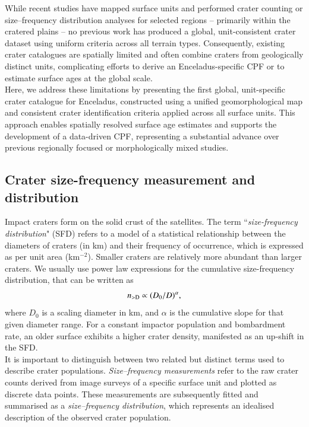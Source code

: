 \documentclass[preprint,11pt,3p,times,authoryear]{elsarticle}
\begin{document}
While recent studies have mapped surface units and performed crater counting or size–frequency distribution analyses for selected regions -- primarily within the cratered plains -- no previous work has produced a global, unit-consistent crater dataset using uniform criteria across all terrain types. Consequently, existing crater catalogues are spatially limited and often combine craters from geologically distinct units, complicating efforts to derive an Enceladus-specific CPF or to estimate surface ages at the global scale.\\

Here, we address these limitations by presenting the first global, unit-specific crater catalogue for Enceladus, constructed using a unified geomorphological map and consistent crater identification criteria applied across all surface units. This approach enables spatially resolved surface age estimates and supports the development of a data-driven CPF, representing a substantial advance over previous regionally focused or morphologically mixed studies.

\subsection{Crater size-frequency measurement and distribution}
\label{sub:sfd}
Impact craters form on the solid crust of the satellites. The term ``{\it size-frequency distribution}" (SFD) refers to a model of a statistical relationship between the diameters of craters (in km) and their frequency of occurrence, which is expressed as per unit area (km$^{-2}$). Smaller craters are relatively more abundant than larger craters. We usually use power law expressions for the cumulative size-frequency distribution, that can be written as
\begin{equation}
  n_{\rm >D} \propto (D_0/D)^\alpha, %
\end{equation}
where $D_0$ is a scaling diameter in km, and $\alpha$ is the cumulative slope for that given diameter range. For a constant impactor population and bombardment rate, an older surface exhibits a higher crater density, manifested as an up-shift in the SFD. \\

It is important to distinguish between two related but distinct terms used to describe crater populations. \textit{Size–frequency measurements} refer to the raw crater counts derived from image surveys of a specific surface unit and plotted as discrete data points. These measurements are subsequently fitted and summarised as a \textit{size–frequency distribution}, which represents an idealised description of the observed crater population. \\
\end{document}
